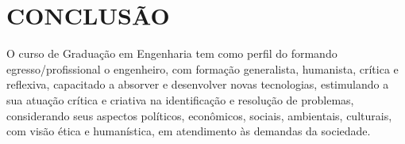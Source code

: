 \chapter{CONCLUSÃO}

O curso de Graduação em Engenharia tem como perfil do formando egresso/profissional o engenheiro, com formação generalista, humanista, crítica e reflexiva, capacitado a absorver e desenvolver novas tecnologias, estimulando a sua atuação crítica e criativa na identificação e resolução de problemas, considerando seus aspectos políticos, econômicos, sociais, ambientais, culturais, com visão ética e humanística, em atendimento às demandas da sociedade.
